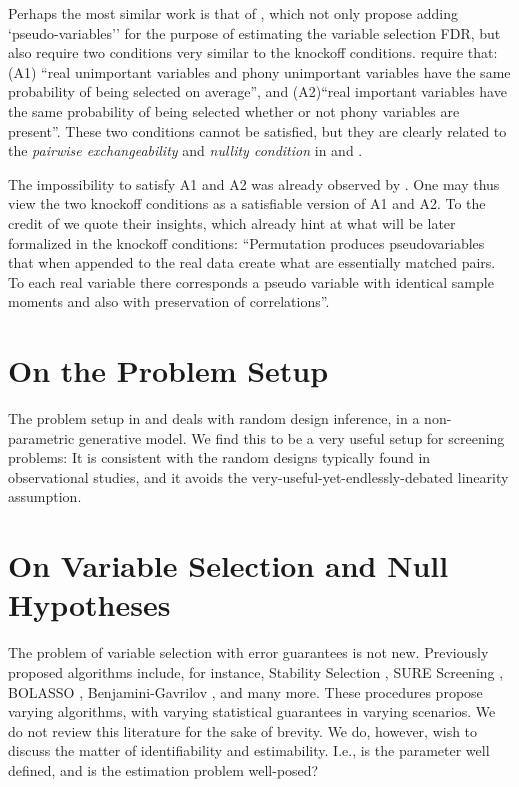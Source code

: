 \documentclass[article,lineno]{biometrika}
\begin{document}
Perhaps the most similar work is that of \cite{WuControllingVariableSelection2007}, which not only propose adding `pseudo-variables'' for the purpose of estimating the variable selection FDR, but also require two conditions very similar to the knockoff conditions. 
\cite{WuControllingVariableSelection2007} require that:
(A1) ``real unimportant variables and phony unimportant variables have the same probability of being selected on average'', and (A2)``real important variables have the same probability of being selected whether or not phony variables are present''.
These two conditions cannot be satisfied, but they are clearly related to the \emph{pairwise exchangeability} and \emph{nullity condition} in \cite{SesiaGenehuntinghidden} and \cite{CandesPanninggoldmodelX2018}.

The impossibility to satisfy A1 and A2 was already observed by \cite{WuControllingVariableSelection2007}. 
One may thus view the two knockoff conditions as a satisfiable version of A1 and A2.
To the credit of \cite{WuControllingVariableSelection2007} we quote their insights, which already hint at what will be later formalized in the knockoff conditions:
``Permutation produces pseudovariables that when appended to the real data create what
are essentially matched pairs. To each real variable there corresponds a pseudo variable with identical sample moments and also with preservation of correlations''.




\section{On the Problem Setup}



The problem setup in \cite{CandesPanninggoldmodelX2018} and \cite{SesiaGenehuntinghidden} deals with random design inference, in a non-parametric generative model.
We find this to be a very useful setup for screening problems:
It is consistent with the random designs typically found in observational studies, and it avoids the very-useful-yet-endlessly-debated linearity assumption. 








\section{On Variable Selection and Null Hypotheses}
The problem of variable selection with error guarantees is not new. 
Previously proposed algorithms include, for instance, Stability Selection \citep{MeinshausenStabilityselection2010}, SURE Screening \citep{fan2008sure}, BOLASSO \citep{bach2008bolasso}, Benjamini-Gavrilov \citep{Benjaminisimpleforwardselection2009}, and many more. 
These procedures propose varying algorithms, with varying statistical guarantees in varying scenarios. 
We do not review this literature for the sake of brevity. 
We do, however, wish to discuss the matter of identifiability and estimability. 
I.e., is the parameter well defined, and is the estimation problem well-posed? 
\end{document}
